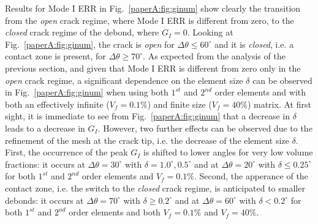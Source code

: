 Results for Mode I ERR in Fig.~\ref{paperA:fig:ginum} show clearly the transition from the \emph{open} crack regime, where Mode I ERR is different from zero, to the \emph{closed} crack regime of the debond, where $G_{I}=0$. Looking at Fig.~\ref{paperA:fig:ginum}, the crack is \emph{open} for $\Delta\theta\leq60^{\circ}$ and it is \emph{closed}, i.e. a contact zone is present, for $\Delta\theta\geq70^{\circ}$. As expected from the analysis of the previous section, and given that Mode I ERR is different from zero only in the \emph{open} crack regime, a significant dependence on the element size $\delta$ can be observed in  Fig.~\ref{paperA:fig:ginum} when using both $1^{st}$ and $2^{nd}$ order elements and with both an effectively infinite ($V_{f}=0.1\%$) and finite size ($V_{f}=40\%$) matrix. At first sight, it is immediate to see from Fig.~\ref{paperA:fig:ginum} that a decrease in $\delta$ leads to a decrease in $G_{I}$. However, two further effects can be observed due to the refinement of the mesh at the crack tip, i.e. the decrease of the element size $\delta$. First, the occurrence of the peak $G_{I}$ is shifted to lower angles for very low volume fractions: it occurs at $\Delta\theta=30^{\circ}$ with $\delta=1.0^{\circ}, 0.5^{\circ}$ and at $\Delta\theta=20^{\circ}$ with $\delta\leq0.25^{\circ}$ for both $1^{st}$ and $2^{nd}$ order elements and $V_{f}=0.1\%$. Second, the apperance of the contact zone, i.e. the switch to the \emph{closed} crack regime, is anticipated to smaller debonds: it occurs at  $\Delta\theta=70^{\circ}$ with $\delta\geq0.2^{\circ}$ and at $\Delta\theta=60^{\circ}$ with $\delta<0.2^{\circ}$ for both $1^{st}$ and $2^{nd}$ order elements and both $V_{f}=0.1\%$ and $V_{f}=40\%$.

